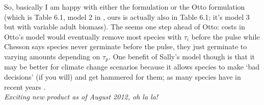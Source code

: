 \documentclass[11pt,a4paper,oneside]{article}
\begin{document}
\noindent So, basically I am happy with either the \citet{Chesson:2004eo} formulation or the Otto formulation (which is Table 6.1, model 2 in \cite{chesson2008}, ours is actually also in Table 6.1; it's model 3 but with variable adult biomass). The \citet{Chesson:2004eo} seems one step ahead of Otto: costs in Otto's model would eventually remove most species with \(\tau_{i}\) before the pulse while Chesson says species never germinate before the pulse, they just germinate to varying amounts depending on \(\tau_{p}\).  One benefit of Sally's model though is that it may be better for climate change scenarios because it allows species to make `bad decisions' (if you will) and get hammered for them; as many species have in recent years \citep[e.g.,][]{Inouye:2008gj}.
\newpage 
{}\\
\noindent \emph{Exciting new product as of August 2012, oh la la!}
\end{document}
